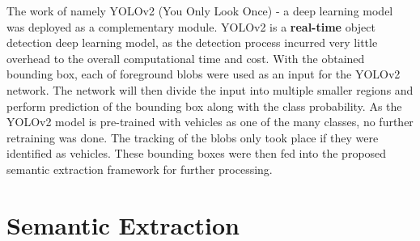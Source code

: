 The work of  namely YOLOv2 (You Only Look Once) - a deep learning model was deployed as a complementary module. YOLOv2 is a \textbf{real-time} object detection deep learning model, as the detection process incurred very little overhead to the overall computational time and cost.
With the obtained bounding box, each of foreground blobs were used as an input for the YOLOv2 network. The network will then divide the input into multiple smaller regions and perform prediction of the bounding box along with the class probability. As the YOLOv2 model is pre-trained with vehicles as one of the many classes, no further retraining was done. The tracking of the blobs only took place if they were identified as vehicles. These bounding boxes were then fed into the proposed semantic extraction framework for further processing.


\section{Semantic Extraction}
\label{section:semanticsExtraction}

